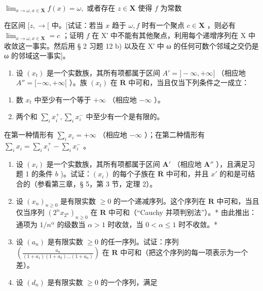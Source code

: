\(\lim_{x \to \omega, x \in \mathbf{X}} f(x) = \omega,\) 或者存在 \(z \in \mathbf{X}\) 使得 \(f\) 为常数

在区间 \([z, \rightarrow[\) 中。{[}试证：若当 \(x\) 趋于 \(\omega, f\) 时有一个聚点 \(c \in \mathbf{X}\) ，则必有 \(\lim_{x \to \omega, x \in \mathbf{X}} = c\) ；证明 \(f\) 在 X′ 中不能有其他聚点，利用每个递增序列在 X 中收敛这一事实。然后用 § 2 习题 12 b) 以及在 X′ 中 ω 的任何可数个邻域之交仍是 ω 的邻域这一事实{]}。

\BourbakiExerciseGroup

\begin{enumerate}
\def\labelenumi{\arabic{enumi})}
\tightlist
\item
设 \((x_{t})\) 是一个实数族，其所有项都属于区间 \(A' = ] - \infty, +\infty]\) （相应地 \(A'' = [-\infty, +\infty[\) ）。族 \((x_{t})\) 在 \(\overline{\mathbf{R}}\) 中可和，当且仅当下列条件之一成立：
\end{enumerate}

\begin{enumerate}
\def\labelenumi{\alph{enumi})}
\item
数 \(x_{t}\) 中至少有一个等于 \(+\infty\) （相应地 \(-\infty\) ）。
\item
两个和 \(\sum_{i} x_{i}^{+}, \sum_{i} x_{i}^{-}\) 中至少有一个是有限的。
\end{enumerate}

在第一种情形有 \(\sum_{i} x_{i} = +\infty\) （相应地 \(-\infty\) ）；在第二种情形有 \(\sum_{i} x_{i} = \sum_{i} x_{i}^{+} - \sum_{i} x_{i}^{-}\) 。

\begin{enumerate}
\def\labelenumi{\arabic{enumi})}
\setcounter{enumi}{1}
\item
设 \((x_{i})\) 是一个实数族，其所有项都属于区间 \(\mathbf{A}'\) （相应地 \(\mathbf{A}''\) ），且满足习题 1 的条件 \(b\) )。试证：\((x_{i})\) 的每个子族在 \(\overline{\mathbf{R}}\) 中可和，并且 \(x'\) 的和是可结合的（参看第三章，§ 5，第 3 节，定理 2）。
\item
设 \((x_{n})_{n\geqslant 0}\) 是有限实数 \(\geqslant 0\) 的一个递减序列。这个序列在 \(\mathbf{R}\) 中可和，当且仅当序列 \((2^{n}x_{2^{n}})_{n\geqslant 0}\) 在 \(\mathbf{R}\) 中可和（``Cauchy 并项判别法''）。* 由此推出：通项为 \(1 / n^{\alpha}\) 的级数当 \(\alpha >1\) 时收敛，当 \(0 < \alpha \leqslant 1\) 时不收敛。*
\item
设 \((a_{n})\) 是有限实数 \(\geqslant 0\) 的任一序列。试证：序列 \(\left(\frac{a_n}{(1 + a_1)(1 + a_2)\ldots(1 + a_n)}\right)\) 在 \(\mathbf{R}\) 中可和（把这个序列的每一项表示为一个差）。
\item
设 \((d_n)\) 是有限实数 \(\geqslant 0\) 的一个序列，满足
\end{enumerate}

